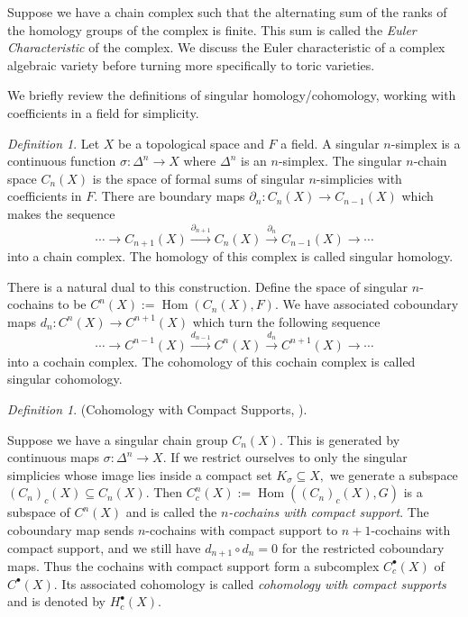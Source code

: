\documentclass[BSc]{usydthesis}
\numberwithin{equation}{chapter}
\theoremstyle{remark}
\newtheorem{Definition}[equation]{Definition}
\DeclareMathOperator{\Hom}{Hom}
\begin{document}
Suppose we have a chain complex such that the alternating sum of the ranks of the homology groups of the complex is finite. This sum is called the {\em Euler Characteristic} of the complex. We discuss the Euler characteristic of a complex algebraic variety before turning more specifically to toric varieties. 


We briefly review the definitions of singular homology/cohomology, working with coefficients in a field for simplicity.

\begin{Definition}{\cite{Hatcher, Spanier}}
Let $X$ be a topological space and $F$ a field. A singular $n$-simplex is a continuous function $\sigma: \Delta^n \to X$ where $\Delta^n$ is an $n$-simplex. The singular $n$-chain space $C_n(X)$ is the space of formal sums of singular $n$-simplicies with coefficients in $F.$ There are boundary maps $\partial_n: C_n(X)\to C_{n-1}(X)$ which makes the sequence $$ \cdots \rightarrow C_{n+1}(X) \xrightarrow{\partial_{n+1}} C_n(X) \xrightarrow{\partial_{n}} C_{n-1}(X) \rightarrow \cdots $$ into a chain complex. The homology of this complex is called singular homology. 
  
There is a natural dual to this construction. Define the space of singular $n$-cochains to be $C^n(X):= \Hom(C_n(X),F).$ We have associated coboundary maps $d_n: C^n(X) \to C^{n+1}(X)$ which turn the following sequence $$ \cdots \rightarrow C^{n-1}(X) \xrightarrow{d_{n-1}} C^n(X) \xrightarrow{d_n} C^{n+1}(X) \rightarrow \cdots$$ into a cochain complex. The cohomology of this cochain complex is called singular cohomology. 
\end{Definition}


\begin{Definition}(Cohomology with Compact Supports, \cite[Page ~ 242]{Hatcher}).
  
  Suppose we have a singular chain group $C_n(X).$ This is generated by continuous maps $\sigma: \Delta^n \to X.$ If we restrict ourselves to only the singular simplicies whose image lies inside a compact set $K_{\sigma}\subseteq X,$ we generate a subspace $(C_n)_c(X)\subseteq C_n(X).$ Then $C^n_c(X):= \Hom\left((C_n)_c(X),G\right)$ is a subspace of $C^n(X)$ and is called the {\em $n$-cochains with compact support}. The coboundary map sends $n$-cochains with compact support to $n+1$-cochains with compact support, and we still have $d_{n+1}\circ d_n = 0$ for the restricted coboundary maps. Thus the cochains with compact support form a subcomplex $C^{\bullet}_c(X)$ of $C^{\bullet}(X).$ Its associated cohomology is called {\em cohomology with compact supports} and is denoted by $H^{\bullet}_c (X).$ 
 
\end{Definition}
\end{document}
